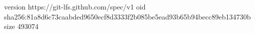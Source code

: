version https://git-lfs.github.com/spec/v1
oid sha256:81a8d6c73caabded9650ecf8d3333f2b085be5ead93b65b94becc89eb134730b
size 493074

